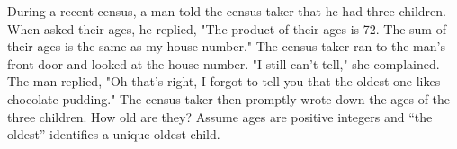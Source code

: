 During a recent census, a man told the census taker that he had three children. When asked their ages, he replied, "The product of their ages is 72. The sum of their ages is the same as my house number." The census taker ran to the man's front door and looked at the house number. "I still can't tell," she complained. The man replied, "Oh that's right, I forgot to tell you that the oldest one likes chocolate pudding." The census taker then promptly wrote down the ages of the three children. How old are they? Assume ages are positive integers and ``the oldest'' identifies a unique oldest child.
